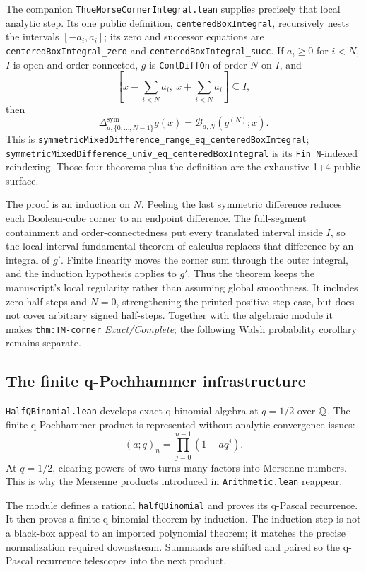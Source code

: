 \documentclass[11pt,oneside]{article}
\theoremstyle{definition}
\theoremstyle{remark}
\begin{document}
The companion \nolinkurl{ThueMorseCornerIntegral.lean} supplies precisely that
local analytic step.  Its one public definition,
\nolinkurl{centeredBoxIntegral}, recursively nests the intervals
\([-a_i,a_i]\); its zero and successor equations are
\nolinkurl{centeredBoxIntegral_zero} and
\nolinkurl{centeredBoxIntegral_succ}.  If \(a_i\geq0\) for \(i<N\), \(I\) is
open and order-connected, \(g\) is \nolinkurl{ContDiffOn} of order \(N\) on
\(I\), and
\[
 [x-\sum_{i<N}a_i,\ x+\sum_{i<N}a_i]\subseteq I,
\]
then
\[
 \Delta^{\mathrm{sym}}_{a,\{0,\ldots,N-1\}}g(x)
 =\mathcal B_{a,N}(g^{(N)};x).
\]
This is
\nolinkurl{symmetricMixedDifference_range_eq_centeredBoxIntegral};
\nolinkurl{symmetricMixedDifference_univ_eq_centeredBoxIntegral} is its
\nolinkurl{Fin N}-indexed reindexing.  Those four theorems plus the definition
are the exhaustive 1+4 public surface.

The proof is an induction on \(N\).  Peeling the last symmetric difference
reduces each Boolean-cube corner to an endpoint difference.  The full-segment
containment and order-connectedness put every translated interval inside
\(I\), so the local interval fundamental theorem of calculus replaces that
difference by an integral of \(g'\).  Finite linearity moves the corner sum
through the outer integral, and the induction hypothesis applies to \(g'\).
Thus the theorem keeps the manuscript's local regularity rather than assuming
global smoothness.  It includes zero half-steps and \(N=0\), strengthening the
printed positive-step case, but does not cover arbitrary signed half-steps.
Together with the algebraic module it makes
\nolinkurl{thm:TM-corner} \emph{Exact/Complete}; the following Walsh probability
corollary remains separate.

\subsection{The finite q-Pochhammer infrastructure}
\nolinkurl{HalfQBinomial.lean} develops exact q-binomial algebra at \(q=1/2\) over \(\mathbb{Q}\).  The finite q-Pochhammer product is represented without analytic convergence issues:
\[
  (a;q)_n=\prod_{j=0}^{n-1}(1-aq^j).
\]
At \(q=1/2\), clearing powers of two turns many factors into Mersenne numbers.  This is why the Mersenne products introduced in \nolinkurl{Arithmetic.lean} reappear.

The module defines a rational \nolinkurl{halfQBinomial} and proves its q-Pascal recurrence.  It then proves a finite q-binomial theorem by induction.  The induction step is not a black-box appeal to an imported polynomial theorem; it matches the precise normalization required downstream.  Summands are shifted and paired so the q-Pascal recurrence telescopes into the next product.
\end{document}
